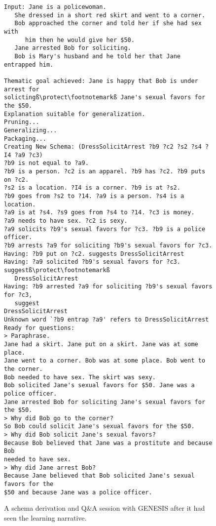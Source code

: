 \begin{figure}
    \begin{lstlisting}[frame=single,escapechar=ß]
Input: Jane is a policewoman.
   She dressed in a short red skirt and went to a corner. 
   Bob approached the corner and told her if she had sex with
      him then he would give her $50.
   Jane arrested Bob for soliciting.
   Bob is Mary's husband and he told her that Jane entrapped him.

Thematic goal achieved: Jane is happy that Bob is under arrest for
solictingß\protect\footnotemarkß Jane's sexual favors for the $50.
Explanation suitable for generalization.
Pruning...
Generalizing...
Packaging...
Creating New Schema: (DressSolicitArrest ?b9 ?c2 ?s2 ?s4 ?I4 ?a9 ?c3)
?b9 is not equal to ?a9.
?b9 is a person. ?c2 is an apparel. ?b9 has ?c2. ?b9 puts on ?c2.
?s2 is a location. ?I4 is a corner. ?b9 is at ?s2.
?b9 goes from ?s2 to ?14. ?a9 is a person. ?s4 is a location.
?a9 is at ?s4. ?s9 goes from ?s4 to ?14. ?c3 is money.
?a9 needs to have sex. ?c2 is sexy.
?a9 solicits ?b9's sexual favors for ?c3. ?b9 is a police officer.
?b9 arrests ?a9 for soliciting ?b9's sexual favors for ?c3.
Having: ?b9 put on ?c2. suggests DressSolicitArrest
Having: ?a9 solicited ?b9's sexual favors for ?c3. suggestß\protect\footnotemarkß
   DressSolicitArrest
Having: ?b9 arrested ?a9 for soliciting ?b9's sexual favors for ?c3,
   suggest
DressSolicitArrest
Unknown word `?b9 entrap ?a9' refers to DressSolicitArrest
Ready for questions:
> Paraphrase.
Jane had a skirt. Jane put on a skirt. Jane was at some place.
Jane went to a corner. Bob was at some place. Bob went to the corner.
Bob needed to have sex. The skirt was sexy.
Bob solicited Jane's sexual favors for $50. Jane was a police officer.
Jane arrested Bob for soliciting Jane's sexual favors for the $50.
> Why did Bob go to the corner?
So Bob could solicit Jane's sexual favors for the $50.
> Why did Bob solicit Jane's sexual favors?
Because Bob believed that Jane was a prostitute and because Bob
needed to have sex.
> Why did Jane arrest Bob?
Because Jane believed that Bob solicited Jane's sexual favors for the
$50 and because Jane was a police officer.
    \end{lstlisting}
\caption{A schema derivation and Q\&A session with GENESIS after it had seen the learning narrative.}
\label{fig:genesisqa2}
\end{figure}

